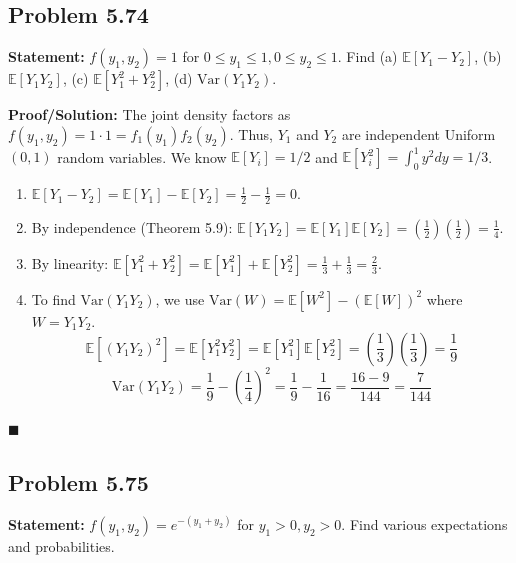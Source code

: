\documentclass[11pt, a4paper]{article}
\theoremstyle{definition}
\theoremstyle{remark}
\newcommand{\E}{\mathbb{E}}
\newcommand{\Var}{\mathrm{Var}}
\begin{document}
\subsection{Problem 5.74}
\textbf{Statement:} $f(y_1, y_2) = 1$ for $0 \leq y_1 \leq 1, 0 \leq y_2 \leq 1$. Find (a) $\E[Y_1 - Y_2]$, (b) $\E[Y_1 Y_2]$, (c) $\E[Y_1^2 + Y_2^2]$, (d) $\Var(Y_1 Y_2)$.

\textbf{Proof/Solution:}
The joint density factors as $f(y_1, y_2) = 1 \cdot 1 = f_1(y_1)f_2(y_2)$. Thus, $Y_1$ and $Y_2$ are independent Uniform$(0,1)$ random variables. We know $\E[Y_i] = 1/2$ and $\E[Y_i^2] = \int_0^1 y^2 dy = 1/3$.
\begin{enumerate}[label=\alph*)]
    \item $\E[Y_1 - Y_2] = \E[Y_1] - \E[Y_2] = \frac{1}{2} - \frac{1}{2} = 0$.
    \item By independence (Theorem 5.9): $\E[Y_1 Y_2] = \E[Y_1]\E[Y_2] = \left(\frac{1}{2}\right)\left(\frac{1}{2}\right) = \frac{1}{4}$.
    \item By linearity: $\E[Y_1^2 + Y_2^2] = \E[Y_1^2] + \E[Y_2^2] = \frac{1}{3} + \frac{1}{3} = \frac{2}{3}$.
    \item To find $\Var(Y_1 Y_2)$, we use $\Var(W) = \E[W^2] - (\E[W])^2$ where $W = Y_1 Y_2$.
    \[
    \E[(Y_1 Y_2)^2] = \E[Y_1^2 Y_2^2] = \E[Y_1^2]\E[Y_2^2] = \left(\frac{1}{3}\right)\left(\frac{1}{3}\right) = \frac{1}{9}
    \]
    \[
    \Var(Y_1 Y_2) = \frac{1}{9} - \left(\frac{1}{4}\right)^2 = \frac{1}{9} - \frac{1}{16} = \frac{16 - 9}{144} = \frac{7}{144}
    \]
\end{enumerate}
\hfill $\blacksquare$

\subsection{Problem 5.75}
\textbf{Statement:} $f(y_1, y_2) = e^{-(y_1+y_2)}$ for $y_1 > 0, y_2 > 0$. Find various expectations and probabilities.
\end{document}
